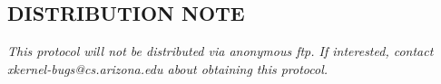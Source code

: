 % 
%
%
%
%
%


\subsection*{DISTRIBUTION NOTE}

{\em
This protocol will not be distributed via anonymous ftp.  If
interested, contact xkernel-bugs@cs.arizona.edu about obtaining this
protocol.
}